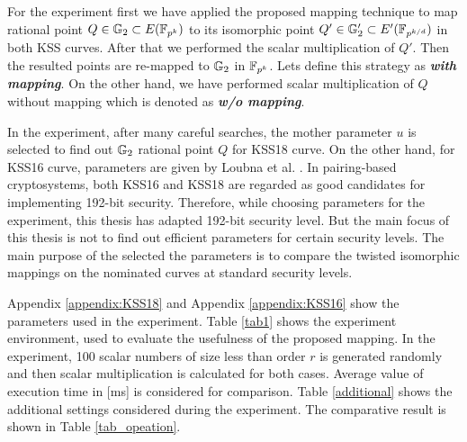 For the experiment first we have applied the proposed mapping technique to map rational point $Q \in {\mathbb{G}}_{2} \subset E({\mathbb{F}}_{p^{k}})$ to its isomorphic point $Q' \in {\mathbb{G}}_{2}' \subset E'(\mathbb{F}_{p^{k/d}})$ in both KSS curves. After that we performed the scalar multiplication of $Q'$. Then the resulted points are re-mapped to ${\mathbb{G}}_{2}$ in $\mathbb{F}_{p^k}$. Lets define this strategy as \textit{\textbf{with mapping}}.
On the other hand, we have performed scalar multiplication of $Q$ without mapping which is denoted as \textit{\textbf{w/o mapping}}.

In the experiment, after many careful searches, the mother parameter $u$ is selected to find out ${\mathbb{G}}_{2}$ rational point $Q$ for KSS18 curve. On the other hand, for KSS16 curve, parameters are given by Loubna et al. \cite{EPRINT:GhaFou16b}.
In pairing-based cryptosystems, both KSS16 and KSS18 are regarded as good candidates for implementing 192-bit security.
Therefore, while choosing parameters for the experiment, this thesis has adapted 192-bit security level. 
But the main focus of this thesis is not to find out efficient parameters for certain security levels. 
The main purpose of the selected the parameters is to compare the twisted isomorphic mappings on the nominated curves at standard security levels. 

Appendix \ref{appendix:KSS18} and Appendix \ref{appendix:KSS16} show the parameters used in the experiment. Table \ref{tab1} shows the experiment environment, used to evaluate the usefulness of the proposed mapping.  
In the experiment, 100 scalar numbers of size less than order $r$ is generated randomly and then scalar multiplication is calculated for both cases. Average value of execution time in [ms] is considered for comparison. Table \ref{additional} shows the additional  settings considered during the experiment. The comparative result is shown in Table \ref{tab_opeation}.

\renewcommand{\baselinestretch}{1.5}
\begin{table*}
\centering
\caption{ Computational Environment}
\label{tab1}
\end{table*}
\renewcommand{\baselinestretch}{1.0}


